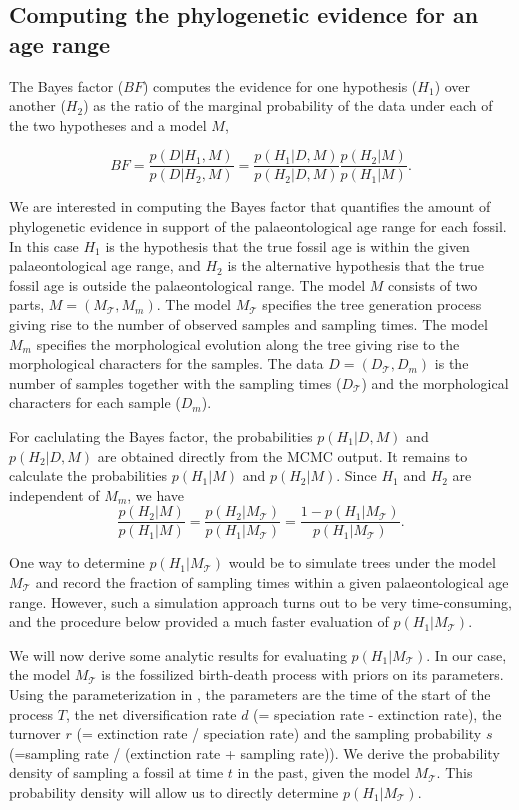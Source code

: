 \documentclass[11pt]{article}
\begin{document}
\subsection*{Computing the phylogenetic evidence for an age range}

The Bayes factor ($BF$) computes the evidence for one hypothesis ($H_1$) over another ($H_2$) as the ratio of the marginal probability of the data under each of the two hypotheses and a model $M$, 

\begin{equation}
BF = \frac{p(D|H_1,M)}{p(D|H_2,M)} = \frac{p(H_1|D,M)}{p(H_2|D,M)}\frac{p(H_2|M)}{p(H_1|M)}.
\end{equation}

We are interested in computing the Bayes factor that quantifies the amount of phylogenetic evidence in support of the palaeontological age range for each fossil. In this case $H_1$ is the hypothesis that the true fossil age is within the given palaeontological age range, and $H_2$ is the alternative hypothesis that the true fossil age is outside the palaeontological range. 
The model $M$ consists of two parts, $M=(M_\mathcal{T},M_m)$. The model $M_\mathcal{T}$ specifies the tree generation process  giving rise to the number of observed samples and sampling times. The model $M_m$ specifies the morphological evolution along the tree giving rise to the morphological characters for the samples. The data $D=(D_\mathcal{T},D_m)$ is the number of samples together with the sampling times ($D_\mathcal{T}$) and  the morphological characters for each sample ($D_m$). 


For caclulating the Bayes factor, the probabilities $p(H_1|D,M)$ and $p(H_2|D,M)$ are obtained directly from the MCMC output.
It remains to calculate the probabilities $p(H_1|M)$ and $p(H_2|M)$.
Since $H_1$ and $H_2$ are independent of $M_m$, we have $$\frac{p(H_2|M)}{p(H_1|M)}=\frac{p(H_2|M_\mathcal{T})}{p(H_1|M_\mathcal{T})}=\frac{1-p(H_1|M_\mathcal{T})}{p(H_1|M_\mathcal{T})}.$$

One way to determine $p(H_1|M_\mathcal{T})$ would be to simulate trees under the model $M_\mathcal{T}$ and record the fraction of sampling times  within a given palaeontological age range. However, such a simulation approach turns out to be very time-consuming, and the procedure below provided a much faster evaluation of $p(H_1|M_\mathcal{T})$.

We  will now derive some analytic results for evaluating $p(H_1|M_\mathcal{T})$. In our case, the model $M_\mathcal{T}$ is the fossilized birth-death process with priors on its parameters. Using the parameterization in \cite{gavryushkina2015bayesian}, the parameters are the time of the start of the process $T$, the net diversification rate $d$ (= speciation rate - extinction rate), the turnover $r$ (= extinction rate / speciation rate) and the sampling probability $s$ (=sampling rate / (extinction rate + sampling rate)).
We derive the probability density of sampling a fossil at time $t$ in the past, given the model $M_\mathcal{T}$. This probability density will allow us to directly determine $p(H_1|M_\mathcal{T})$.
\end{document}

